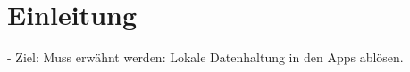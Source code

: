 \section{Einleitung}\label{sec:einleitung}

- Ziel: Muss erwähnt werden: Lokale Datenhaltung in den Apps ablösen. %